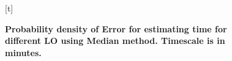 \documentclass{sig-alternate}
\begin{document}
\begin{figure}[t]
\centering
\begin{minipage}{.5\textwidth}[t]%
  \centering
  \par        
{}
\caption{\textbf{Probability density of Error for estimating time for
different LO using Median method. Timescale is in minutes.}}
\label{fig:f6}
\end{minipage}
\end{figure}
\end{document}
